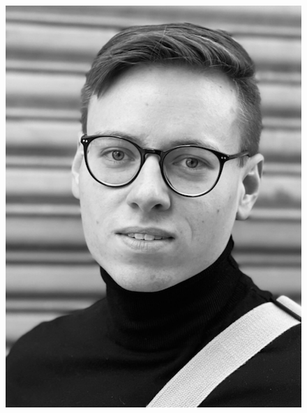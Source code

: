 \documentclass[10pt, a4paper,onecolumn ,titlepage]{article}
\begin{document}
\begin{titlepage}
\begin{center}
\begin{figure}[H]
\begin{minipage}[b]{.13\linewidth}
                    \includegraphics[width=\linewidth]{author_pictures/chris_2}
                \end{minipage}\label{fig:lennart}
                \hspace{.005\linewidth}%
                \begin{minipage}[b]{.13\linewidth} %

\end{minipage}
\end{figure}
\end{center}
\end{titlepage}
\end{document}
